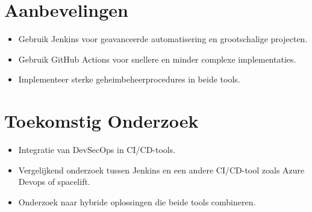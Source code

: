 \documentclass[a0,portrait]{hogent-poster}
\begin{document}
\begin{multicols}{2}
        \section*{Aanbevelingen}
        \begin{itemize}
            \item Gebruik Jenkins voor geavanceerde automatisering en grootschalige projecten.
            \item Gebruik GitHub Actions voor snellere en minder complexe implementaties.
            \item Implementeer sterke geheimbeheerprocedures in beide tools.
        \end{itemize}
        
        \section*{Toekomstig Onderzoek}
        \begin{itemize}
            \item Integratie van DevSecOps in CI/CD-tools.
            \item Vergelijkend onderzoek tussen Jenkins en een andere CI/CD-tool zoals Azure Devops of spacelift.
            \item Onderzoek naar hybride oplossingen die beide tools combineren.
        \end{itemize}
        
    \end{multicols}
    
\end{document}
